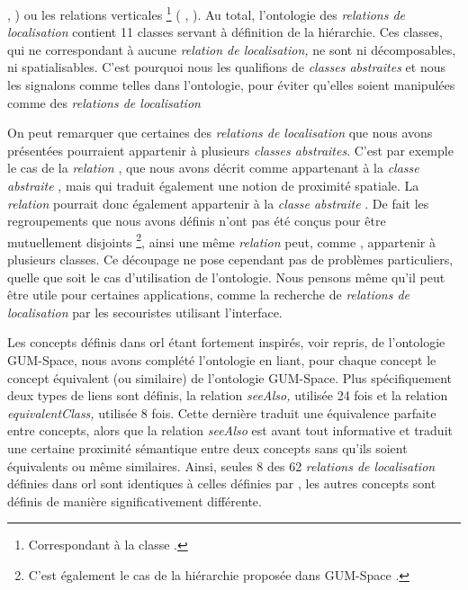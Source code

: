 , ) ou
les relations verticales \footnote{Correspondant à la classe
  .} (\eg
{}, ). Au
total, l'ontologie des \emph{relations de localisation} contient 11
classes servant à définition de la hiérarchie. Ces classes, qui ne
correspondant à aucune \emph{relation de localisation,} ne sont ni
décomposables, ni spatialisables. C'est pourquoi nous les qualifions
de \emph{classes abstraites} et nous les signalons comme telles dans
l'ontologie, pour éviter qu'elles soient manipulées comme des
\emph{relations de localisation} 

On peut remarquer que certaines des \emph{relations de localisation}
que nous avons présentées pourraient appartenir à plusieurs
\emph{classes abstraites}. C'est par exemple le cas de la
\emph{relation} , que nous avons décrit comme
appartenant à la \emph{classe abstraite}
, mais qui
traduit également une notion de proximité spatiale. La \emph{relation}
 pourrait donc également appartenir à la
\emph{classe abstraite}
. De fait les
regroupements que nous avons définis n'ont pas été conçus pour être
mutuellement disjoints \footnote{C'est également le cas de la
  hiérarchie proposée dans GUM-Space \autocite{Bateman2010}.}, ainsi
une même \emph{relation} peut, comme ,
appartenir à plusieurs classes. Ce découpage ne pose cependant pas de
problèmes particuliers, quelle que soit le cas d'utilisation de
l'ontologie. Nous pensons même qu'il peut être utile pour certaines
applications, comme la recherche de \emph{relations de localisation}
par les secouristes utilisant l'interface.

Les concepts définis dans \ac{orl} étant fortement inspirés, voir
repris, de l'ontologie GUM-Space, nous avons complété l'ontologie en
liant, pour chaque concept le concept équivalent (ou similaire) de
l'ontologie GUM-Space. Plus spécifiquement deux types de liens sont
définis, la relation \emph{seeAlso,} utilisée 24 fois et la relation
\emph{equivalentClass,} utilisée 8 fois. Cette dernière traduit une
équivalence parfaite entre concepts, alors que la relation
\emph{seeAlso} est avant tout informative et traduit une certaine
proximité sémantique entre deux concepts sans qu'ils soient
équivalents ou même similaires. Ainsi, seules 8 des 62 \emph{relations
  de localisation} définies dans \ac{orl} sont identiques à celles
définies par \textcite{Bateman2010}, les autres concepts sont définis
de manière significativement différente.

